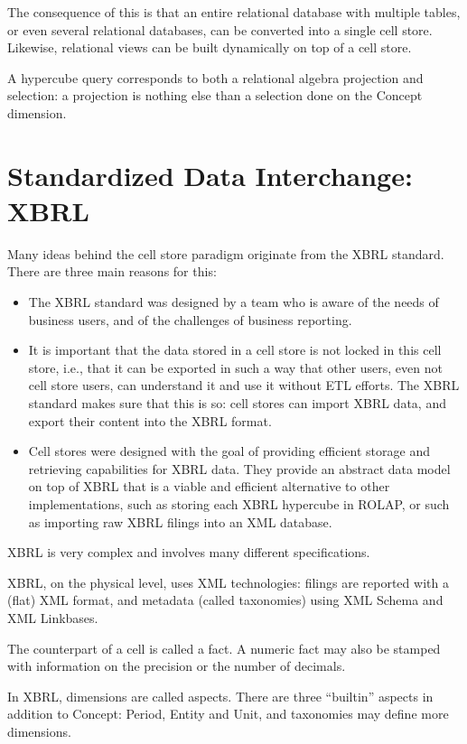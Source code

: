 \documentclass{vldb}
\begin{document}
The consequence of this is that an entire relational database with multiple tables, or even several relational databases, can be converted into a single cell store. Likewise, relational views can be built dynamically on top of a cell store.

A hypercube query corresponds to both a relational algebra projection and selection: a projection is nothing else than a selection done on the Concept dimension.

\section{Standardized Data Interchange: XBRL}
\label{section-xbrl-standard}
Many ideas behind the cell store paradigm originate from the XBRL standard. There are three main reasons for this:

\begin{itemize}
\item The XBRL standard was designed by a team who is aware of the needs of business users, and of the challenges of business reporting.
\item It is important that the data stored in a cell store is not locked in this cell store, i.e., that it can be exported in such a way that other users, even not cell store users, can understand it and use it without ETL efforts. The XBRL standard makes sure that this is so: cell stores can import XBRL data, and export their content into the XBRL format.
\item Cell stores were designed with the goal of providing efficient storage and retrieving capabilities for XBRL data. They provide an abstract data model on top of XBRL that is a viable and efficient alternative to other implementations, such as storing each XBRL hypercube in ROLAP, or such as importing raw XBRL filings into an XML database.
\end{itemize}

XBRL is very complex and involves many different specifications.

XBRL, on the physical level, uses XML technologies: filings are reported with a (flat) XML format, and metadata (called taxonomies) using XML Schema and XML Linkbases.

The counterpart of a cell is called a fact. A numeric fact may also be stamped with information on the precision or the number of decimals.

In XBRL, dimensions are called aspects. There are three ``builtin'' aspects in addition to Concept: Period, Entity and Unit, and taxonomies may define more dimensions.
\end{document}
